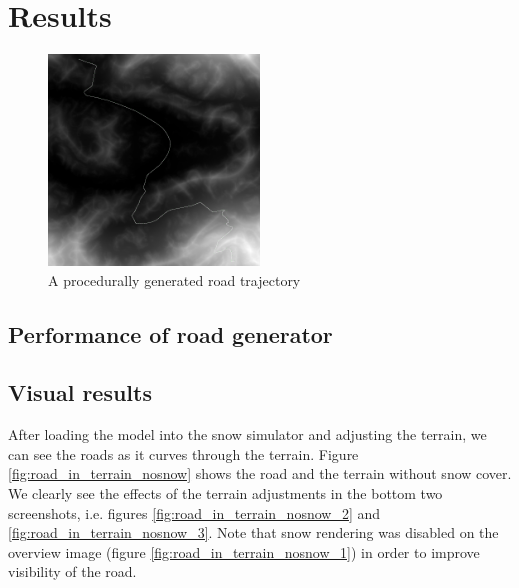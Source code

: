 \chapter{Results}
\label{chap:results}

\begin{figure}[ht]
\centering
\includegraphics[width=0.5\textwidth]{figure/generated_road_trajectory}
\caption{A procedurally generated road trajectory}
\label{fig:road_trajectory}
\end{figure}

\section{Performance of road generator}

\section{Visual results}
After loading the model into the snow simulator and adjusting the terrain, we can see the roads as it curves through the terrain. Figure \ref{fig:road_in_terrain_nosnow} shows the road and the terrain without snow cover. We clearly see the effects of the terrain adjustments in the bottom two screenshots, i.e. figures \ref{fig:road_in_terrain_nosnow_2} and \ref{fig:road_in_terrain_nosnow_3}. Note that snow rendering was disabled on the overview image (figure \ref{fig:road_in_terrain_nosnow_1}) in order to improve visibility of the road.


